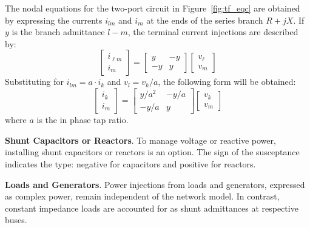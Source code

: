 The nodal equations for the two-port circuit in Figure~\cref{fig:tf_eqc} are obtained by expressing the currents $i_{lm}$ and $i_{m}$ at the ends of the series branch \(R+jX\). If $y$ is the branch admittance \(l-m\), the terminal current injections are described by:
\begin{equation}
    \left[\begin{array}{c}
i_{\ell m} \\
i_{m}
\end{array}\right]=\left[\begin{array}{rr}
y & -y \\
-y & y
\end{array}\right]\left[\begin{array}{c}
v_{\ell} \\
v_{m}
\end{array}\right]
\end{equation}
Substituting for \(i_{lm} = a \cdot i_{k}\) and \(v_{l} = v_{k}/a\), the following form will be obtained:
\begin{equation}
    \left[\begin{array}{c}
i_{k} \\
i_{m}
\end{array}\right]=\left[\begin{array}{rr}
y / a^{2} & -y / a \\
-y / a & y
\end{array}\right]\left[\begin{array}{c}
v_{k} \\
v_{m}
\end{array}\right]
\end{equation}
where $a$ is the in phase tap ratio.

\textbf{Shunt Capacitors or Reactors}. To manage voltage or reactive power, installing shunt capacitors or reactors is an option. The sign of the susceptance indicates the type: negative for capacitors and positive for reactors.

\textbf{Loads and Generators}. Power injections from loads and generators, expressed as complex power, remain independent of the network model. In contrast, constant impedance loads are accounted for as shunt admittances at respective buses.

